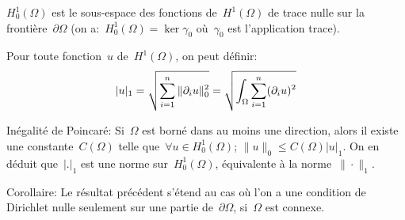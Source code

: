 \medskip
$H^1_0(\Omega)$ est le sous-espace des fonctions de~$H^1(\Omega)$ de trace nulle sur la frontière~$\partial\Omega$ (on a:~$H^1_0(\Omega)=\ker\gamma_0$ où~$\gamma_0$ est l'application trace).

\medskip
Pour toute fonction~$u$ de~$H^1(\Omega)$, on peut définir:
\[
|u|_1=\sqrt{\displaystyle\sum_{i=1}^n\|\partial_i u\|_ 0^2} =
\sqrt{\displaystyle\int_\Omega\displaystyle\sum_{i=1}^n (\partial_i u)^2}
\]

\medskip
Inégalité de Poincaré:
Si~$\Omega$ est borné dans au moins une direction, alors il existe une constante~$C(\Omega)$ telle que~$\forall u\in H^1_0(\Omega)$; 
$\|u\|_0 \le C(\Omega) |u|_1$.
On en déduit que~$|.|_1$ est une norme sur~$H^1_0(\Omega)$, équivalente à la norme~$\|\cdot\|_1$.

\medskip
Corollaire: 
Le résultat précédent s'étend au cas où l'on a une condition de Dirichlet nulle seulement sur une partie de~$\partial\Omega$, si~$\Omega$ est connexe.


